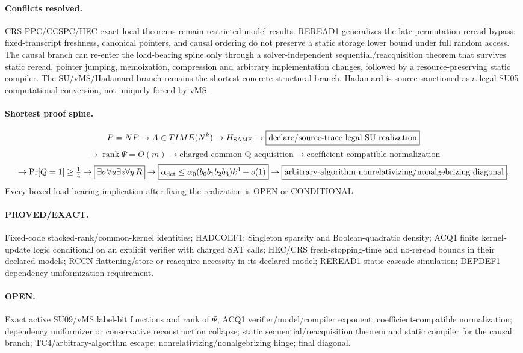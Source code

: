 \documentclass[11pt]{article}
\begin{document}
\paragraph{Conflicts resolved.} CRS-PPC/CCSPC/HEC exact local theorems remain restricted-model results. REREAD1 generalizes the late-permutation reread bypass: fixed-transcript freshness, canonical pointers, and causal ordering do not preserve a static storage lower bound under full random access. The causal branch can re-enter the load-bearing spine only through a solver-independent sequential/reacquisition theorem that survives static reread, pointer jumping, memoization, compression and arbitrary implementation changes, followed by a resource-preserving static compiler. The SU/vMS/Hadamard branch remains the shortest concrete structural branch. Hadamard is source-sanctioned as a legal SU05 computational conversion, not uniquely forced by vMS.

\paragraph{Shortest proof spine.}
\[
P=NP\to A\in TIME(N^k)\to H_{\rm SAME}\to\boxed{\text{declare/source-trace legal SU realization}}
\]
\[
\to\boxed{\operatorname{rank}\Psi=O(m)}\to\boxed{\text{charged common-Q acquisition}}\to\boxed{\text{coefficient-compatible normalization}}
\]
\[
\to\Pr[Q=1]\ge\tfrac14\to\boxed{\exists\sigma\forall u\exists z\forall y\,R}
\to\boxed{\alpha_{\rm det}\le\alpha_0(b_0b_1b_2b_3)k^4+o(1)}
\to\boxed{\text{arbitrary-algorithm nonrelativizing/nonalgebrizing diagonal}}.
\]
Every boxed load-bearing implication after fixing the realization is OPEN or CONDITIONAL.

\paragraph{PROVED/EXACT.} Fixed-code stacked-rank/common-kernel identities; HADCOEF1; Singleton sparsity and Boolean-quadratic density; ACQ1 finite kernel-update logic conditional on an explicit verifier with charged SAT calls; HEC/CRS fresh-stopping-time and no-reread bounds in their declared models; RCCN flattening/store-or-reacquire necessity in its declared model; REREAD1 static cascade simulation; DEPDEF1 dependency-uniformization requirement.

\paragraph{OPEN.} Exact active SU09/vMS label-bit functions and rank of \(\Psi\); ACQ1 verifier/model/compiler exponent; coefficient-compatible normalization; dependency uniformizer or conservative reconstruction collapse; static sequential/reacquisition theorem and static compiler for the causal branch; TC4/arbitrary-algorithm escape; nonrelativizing/nonalgebrizing hinge; final diagonal.
\end{document}
